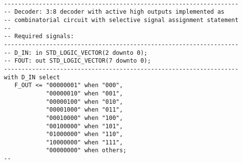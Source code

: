 \noindent
\begin{minipage}{0.99\linewidth}
\begin{lstlisting}

-------------------------------------------------------------------
-- Decoder: 3:8 decoder with active high outputs implemented as
-- combinatorial circuit with selective signal assignment statement
--
-- Required signals: 
-------------------------------------------------------------------
-- D_IN: in STD_LOGIC_VECTOR(2 downto 0); 
-- FOUT: out STD_LOGIC_VECTOR(7 downto 0); 
-------------------------------------------------------------------
with D_IN select
   F_OUT <= "00000001" when "000",
            "00000010" when "001",
            "00000100" when "010",
            "00001000" when "011",
            "00010000" when "100",
            "00100000" when "101",
            "01000000" when "110",
            "10000000" when "111",
            "00000000" when others;
--
\end{lstlisting}
\end{minipage}



